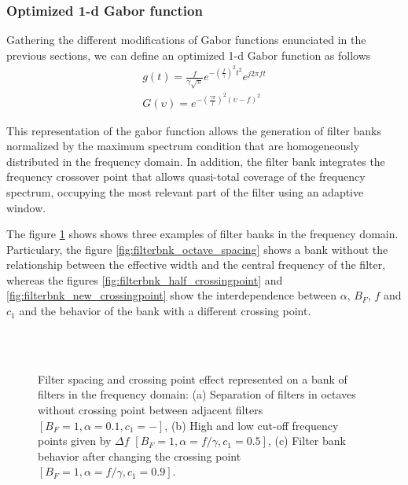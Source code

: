\subsubsection{Optimized 1-d Gabor function}
Gathering the different modifications of Gabor functions enunciated in the previous sections, we can define an optimized 1-d Gabor function as follows
\begin{equation}\label{eq:gabor_function_1d_timefreq_bank}
    \begin{gathered}
         g(t) =  \frac{f}{\gamma \sqrt{\pi}} e ^{-\left(\frac{f}{\gamma}\right)^2 t^2} e ^{j 2 \pi f t } \\
         G(\upsilon) =  e ^{-\left(\frac{\gamma \pi}{f}\right) ^2 (\upsilon-f)^2}
     \end{gathered}
\end{equation}

This representation of the gabor function allows the generation of filter banks normalized by the maximum spectrum condition that are homogeneously distributed in the frequency domain. In addition, the filter bank integrates the frequency crossover point that allows quasi-total coverage of the frequency spectrum, occupying the most relevant part of the filter using an adaptive window.

The figure \ref{fig:1d_filterbank_spacing} shows shows three examples of filter banks in the frequency domain. Particulary, the figure \ref{fig:filterbnk_octave_spacing} shows a bank without the relationship between the effective width and the central frequency of the filter, whereas the figures \ref{fig:filterbnk_half_crossingpoint} and \ref{fig:filterbnk_new_crossingpoint} show the interdependence between $\alpha$, $B_F$, $f$ and $c_1$ and the behavior of the bank with a different crossing point.

\begin{figure}[!ht]
\centering
     \\
    \\
\caption{Filter spacing and crossing point effect represented on a bank of filters in the frequency domain: (a) Separation of filters in octaves without crossing point between adjacent filters $[B_F=1, \alpha=0.1, c_1=-]$, (b) High and low cut-off frequency points given by $\Delta f$ $[B_F=1, \alpha=f/\gamma, c_1=0.5]$, (c) Filter bank behavior after changing the crossing point $[B_F=1, \alpha=f/\gamma, c_1=0.9]$.}\label{fig:1d_filterbank_spacing}
\end{figure}


